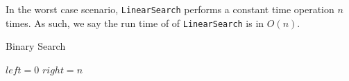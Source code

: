 In the worst case scenario, \texttt{LinearSearch} performs a constant time operation $n$ times. As such, we say the run time of of \texttt{LinearSearch} is in $O(n)$.

\begin{algorithm}[H]
    \caption{Binary Search}
    \label{alg:binary-search}
    \begin{algorithmic}[1]
            \State $left = 0$
            \State $right = n$
        \EndProcedure
    \end{algorithmic}
\end{algorithm}